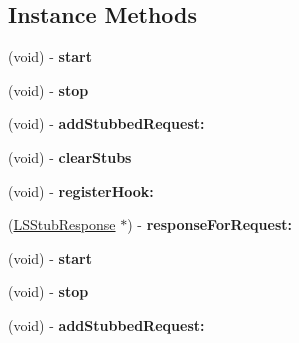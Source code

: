 \subsection*{Instance Methods}
\begin{DoxyCompactItemize}
\item 
\hypertarget{interface_l_s_nocilla_ab854c32d42b3aa2cf87b42b4b7780fca}{(void) -\/ {\bfseries start}}\label{interface_l_s_nocilla_ab854c32d42b3aa2cf87b42b4b7780fca}

\item 
\hypertarget{interface_l_s_nocilla_a56593121ff9cc9eb8797115d98cde10f}{(void) -\/ {\bfseries stop}}\label{interface_l_s_nocilla_a56593121ff9cc9eb8797115d98cde10f}

\item 
\hypertarget{interface_l_s_nocilla_ad5f2491086f08b6d151453d447e8e4b8}{(void) -\/ {\bfseries add\-Stubbed\-Request\-:}}\label{interface_l_s_nocilla_ad5f2491086f08b6d151453d447e8e4b8}

\item 
\hypertarget{interface_l_s_nocilla_aca31e9357a78120393f0cfb538360707}{(void) -\/ {\bfseries clear\-Stubs}}\label{interface_l_s_nocilla_aca31e9357a78120393f0cfb538360707}

\item 
\hypertarget{interface_l_s_nocilla_aa787aea554dc67b1880b183ec7b091f5}{(void) -\/ {\bfseries register\-Hook\-:}}\label{interface_l_s_nocilla_aa787aea554dc67b1880b183ec7b091f5}

\item 
\hypertarget{interface_l_s_nocilla_affd0430092d4c595a99df1ff581adcc1}{(\hyperlink{interface_l_s_stub_response}{L\-S\-Stub\-Response} $\ast$) -\/ {\bfseries response\-For\-Request\-:}}\label{interface_l_s_nocilla_affd0430092d4c595a99df1ff581adcc1}

\item 
\hypertarget{interface_l_s_nocilla_ab854c32d42b3aa2cf87b42b4b7780fca}{(void) -\/ {\bfseries start}}\label{interface_l_s_nocilla_ab854c32d42b3aa2cf87b42b4b7780fca}

\item 
\hypertarget{interface_l_s_nocilla_a56593121ff9cc9eb8797115d98cde10f}{(void) -\/ {\bfseries stop}}\label{interface_l_s_nocilla_a56593121ff9cc9eb8797115d98cde10f}

\item 
\hypertarget{interface_l_s_nocilla_ad5f2491086f08b6d151453d447e8e4b8}{(void) -\/ {\bfseries add\-Stubbed\-Request\-:}}\label{interface_l_s_nocilla_ad5f2491086f08b6d151453d447e8e4b8}


\end{DoxyCompactItemize}
